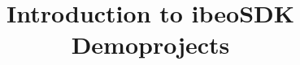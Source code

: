 \newcommand{\commondocpath}{../../../common/doc}




\title{Introduction to ibeoSDK Demoprojects}
\newpage


\newpage


\newpage


